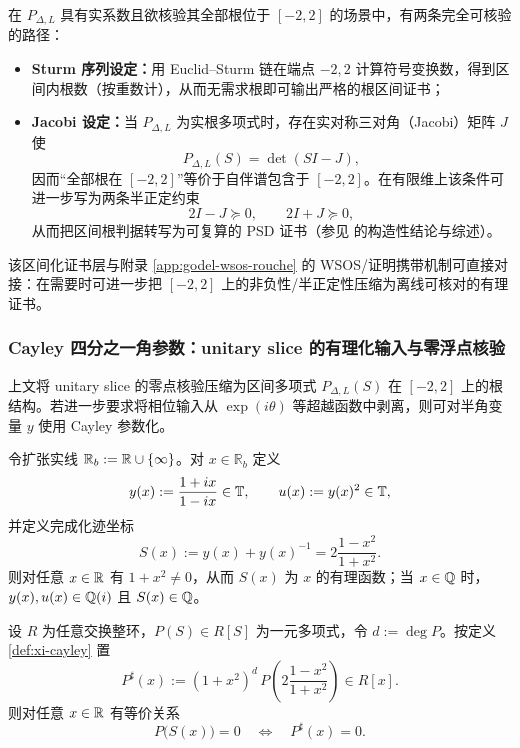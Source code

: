 \begin{remark}\label{rem:interval-root-audit}
在 $P_{\Delta,L}$ 具有实系数且欲核验其全部根位于 $[-2,2]$ 的场景中，有两条完全可核验的路径：
\begin{itemize}
  \item \textbf{Sturm 序列设定：}用 Euclid--Sturm 链在端点 $-2,2$ 计算符号变换数，得到区间内根数（按重数计），从而无需求根即可输出严格的根区间证书；
  \item \textbf{Jacobi 设定：}当 $P_{\Delta,L}$ 为实根多项式时，存在实对称三对角（Jacobi）矩阵 $J$ 使
  $$
  P_{\Delta,L}(S)=\det(SI-J),
  $$
  因而“全部根在 $[-2,2]$”等价于自伴谱包含于 $[-2,2]$。在有限维上该条件可进一步写为两条半正定约束
  $$
  2I-J\succeq 0,\qquad 2I+J\succeq 0,
  $$
  从而把区间根判据转写为可复算的 PSD 证书（参见 \cite{Fiedler1990SymmetricCharpoly,Schmeisser1993TridiagonalGivenCharpoly} 的构造性结论与综述）。
\end{itemize}
该区间化证书层与附录 \ref{app:godel-wsos-rouche} 的 WSOS/证明携带机制可直接对接：在需要时可进一步把 $[-2,2]$ 上的非负性/半正定性压缩为离线可核对的有理证书。
\end{remark}

\subsubsection{Cayley 四分之一角参数：unitary slice 的有理化输入与零浮点核验}\label{subsec:xi-cayley-rational}
上文将 unitary slice 的零点核验压缩为区间多项式 $P_{\Delta,L}(S)$ 在 $[-2,2]$ 上的根结构。若进一步要求将相位输入从 $\exp(i\theta)$ 等超越函数中剥离，则可对半角变量 $y$ 使用 Cayley 参数化。

\begin{definition}\label{def:xi-cayley}
令扩张实线 $\mathbb{R}_b:=\mathbb{R}\cup\{\infty\}$。对 $x\in\mathbb{R}_b$ 定义
$$
y(x):=\frac{1+ix}{1-ix}\in\mathbb{T},\qquad u(x):=y(x)^2\in\mathbb{T},
$$
并定义完成化迹坐标
$$
S(x):=y(x)+y(x)^{-1}=2\frac{1-x^2}{1+x^2}.
$$
则对任意 $x\in\mathbb{R}$ 有 $1+x^2\neq 0$，从而 $S(x)$ 为 $x$ 的有理函数；当 $x\in\mathbb{Q}$ 时，$y(x),u(x)\in\mathbb{Q}(i)$ 且 $S(x)\in\mathbb{Q}$。
\end{definition}

\begin{theorem}[区间多项式的有理化清分母]\label{thm:xi-cayley-denom-clear}
设 $R$ 为任意交换整环，$P(S)\in R[S]$ 为一元多项式，令 $d:=\deg P$。按定义 \ref{def:xi-cayley} 置
$$
P^\sharp(x):=(1+x^2)^d\,P\!\left(2\frac{1-x^2}{1+x^2}\right)\in R[x].
$$
则对任意 $x\in\mathbb{R}$ 有等价关系
$$
P\bigl(S(x)\bigr)=0\quad\Longleftrightarrow\quad P^\sharp(x)=0.
$$
\end{theorem}

